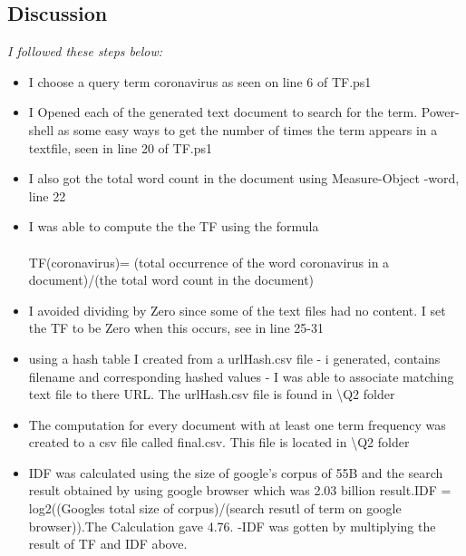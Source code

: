 \documentclass[12pt]{article}
\begin{document}
\subsection*{Discussion}
\emph{I followed these steps  below:}
    \begin{itemize}
        \item I choose a query term coronavirus as seen on line 6 of TF.ps1
        \item I Opened each of the generated text document to  search for the term. Power-shell as some easy ways to get the number of times the term appears in a textfile, seen in line 20 of TF.ps1 
        
        \item I also got the total word count in the document using Measure-Object -word, line 22
        
        \item I was able to compute the the TF using the formula\\ \\ TF(coronavirus)= (total occurrence of the word coronavirus in a document)/(the total word count in the document)
        \item I avoided dividing by Zero since some of the text files had no content. I set the TF to be Zero when this occurs, see in line 25-31
         
         \item using a hash table I created from a urlHash.csv file - i generated, contains filename and corresponding hashed values - I was able to associate matching text file to there URL. The urlHash.csv file is found in \textbackslash Q2 folder
         \item The computation for every document with at least one term frequency was created to a csv file called final.csv. This file is located in  \textbackslash Q2 folder
         \item IDF was calculated using the size of google's corpus of 55B and the search result obtained by using google browser which was 2.03 billion result.IDF = log2((Googles total size of corpus)/(search resutl of term on google browser)).The Calculation gave 4.76.
         \TF-IDF was gotten by multiplying the result of TF and IDF above. 
         
    \end{itemize}
\end{document}
